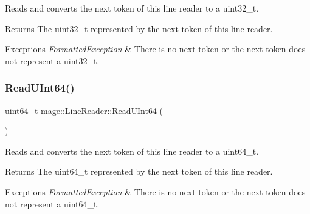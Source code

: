 Reads and converts the next token of this line reader to a {\ttfamily uint32\+\_\+t}.

\begin{DoxyReturn}{Returns}
The {\ttfamily uint32\+\_\+t} represented by the next token of this line reader. 
\end{DoxyReturn}

\begin{DoxyExceptions}{Exceptions}
{\em \hyperlink{structmage_1_1_formatted_exception}{Formatted\+Exception}} & There is no next token or the next token does not represent a {\ttfamily uint32\+\_\+t}. \\
\hline
\end{DoxyExceptions}
\hypertarget{classmage_1_1_line_reader_ac05624eb7a786bfc1391b22095da1e71}{}\label{classmage_1_1_line_reader_ac05624eb7a786bfc1391b22095da1e71} 
\subsubsection{\texorpdfstring{Read\+U\+Int64()}{ReadUInt64()}}
{\footnotesize\ttfamily uint64\+\_\+t mage\+::\+Line\+Reader\+::\+Read\+U\+Int64 (\begin{DoxyParamCaption}{ }\end{DoxyParamCaption})\hspace{0.3cm}{\ttfamily [protected]}}

Reads and converts the next token of this line reader to a {\ttfamily uint64\+\_\+t}.

\begin{DoxyReturn}{Returns}
The {\ttfamily uint64\+\_\+t} represented by the next token of this line reader. 
\end{DoxyReturn}

\begin{DoxyExceptions}{Exceptions}
{\em \hyperlink{structmage_1_1_formatted_exception}{Formatted\+Exception}} & There is no next token or the next token does not represent a {\ttfamily uint64\+\_\+t}. \\
\hline
\end{DoxyExceptions}
\hypertarget{classmage_1_1_line_reader_a943ce0074c0861109f8b4ee10df8a221}{}\label{classmage_1_1_line_reader_a943ce0074c0861109f8b4ee10df8a221} 
